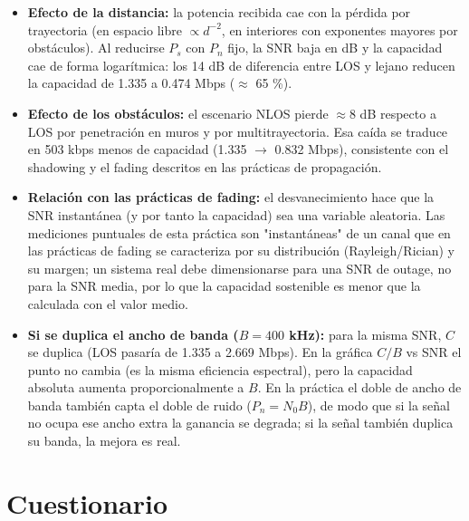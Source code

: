 \documentclass[11pt,a4paper]{article}
\begin{document}
\begin{itemize}
  \item \textbf{Efecto de la distancia:} la potencia recibida cae con la pérdida por trayectoria (en espacio libre $\propto d^{-2}$, en interiores con exponentes mayores por obstáculos). Al reducirse $P_s$ con $P_n$ fijo, la SNR baja en dB y la capacidad cae de forma logarítmica: los 14 dB de diferencia entre LOS y lejano reducen la capacidad de 1.335 a 0.474 Mbps ($\approx$ 65 \%).
  \item \textbf{Efecto de los obstáculos:} el escenario NLOS pierde $\approx$8 dB respecto a LOS por penetración en muros y por multitrayectoria. Esa caída se traduce en 503 kbps menos de capacidad (1.335 $\rightarrow$ 0.832 Mbps), consistente con el shadowing y el fading descritos en las prácticas de propagación.
  \item \textbf{Relación con las prácticas de fading:} el desvanecimiento hace que la SNR instantánea (y por tanto la capacidad) sea una variable aleatoria. Las mediciones puntuales de esta práctica son "instantáneas" de un canal que en las prácticas de fading se caracteriza por su distribución (Rayleigh/Rician) y su margen; un sistema real debe dimensionarse para una SNR de outage, no para la SNR media, por lo que la capacidad sostenible es menor que la calculada con el valor medio.
  \item \textbf{Si se duplica el ancho de banda ($B = 400$ kHz):} para la misma SNR, $C$ se duplica (LOS pasaría de 1.335 a 2.669 Mbps). En la gráfica $C/B$ vs SNR el punto no cambia (es la misma eficiencia espectral), pero la capacidad absoluta aumenta proporcionalmente a $B$. En la práctica el doble de ancho de banda también capta el doble de ruido ($P_n = N_0 B$), de modo que si la señal no ocupa ese ancho extra la ganancia se degrada; si la señal también duplica su banda, la mejora es real.
\end{itemize}

\section{Cuestionario}
\end{document}
